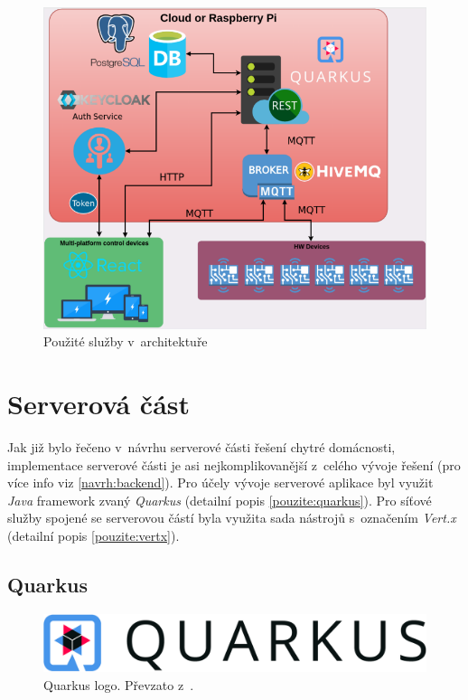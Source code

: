 \begin{figure}[hbt]
  \centering
  \includegraphics[width=0.9 \linewidth]{obrazky-figures/technologie.png}
  \caption{Použité služby v~architektuře}
  \label{figure:technologie_architektura}
\end{figure}

\newpage
\section{Serverová část}
\label{pouzite:backend}
Jak již bylo řečeno v~návrhu serverové části řešení chytré domácnosti, implementace serverové části je asi nejkomplikovanější z~celého vývoje řešení (pro více info viz \ref{navrh:backend}).
Pro účely vývoje serverové aplikace byl využit \emph{Java} framework zvaný \emph{Quarkus} (detailní popis \ref{pouzite:quarkus}).
Pro síťové služby spojené se serverovou částí byla využita sada nástrojů s~označením \emph{Vert.x} (detailní popis \ref{pouzite:vertx}).

\subsection*{Quarkus}
\label{pouzite:quarkus}

\begin{figure}[!ht]
  \centering
  \includegraphics[width=.45 \linewidth]{obrazky-figures/quarkus_logo.png}
  \caption{Quarkus logo. Převzato z~\cite{quarkus:website}.}
  \label{figure:quarkus_logo}
\end{figure}

